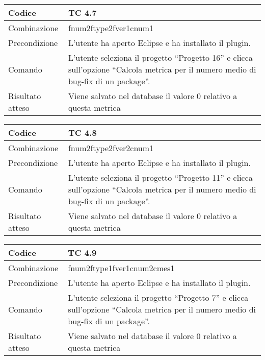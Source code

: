 \begin{table}[ht]
\begin{tabular}{|p{3cm}|p{9cm}|}
\hline
\cellcolor{lightgray}Codice				& TC 4.7								\\
\hline
\cellcolor{lightgray}Combinazione		& fnum2ftype2fver1cnum1							\\
\hline
\cellcolor{lightgray}Precondizione		& L'utente ha aperto Eclipse e ha installato il plugin.									\\
\hline
\cellcolor{lightgray}Comando			& L'utente seleziona il progetto ``Progetto 16''  e clicca sull'opzione ``Calcola metrica per il numero medio di bug-fix di un package''.	\\
\hline
\cellcolor{lightgray}Risultato atteso	& Viene salvato nel database il valore 0 relativo a questa metrica	\\
\hline
\end{tabular}
\end{table}

\begin{table}[ht]
\begin{tabular}{|p{3cm}|p{9cm}|}
\hline
\cellcolor{lightgray}Codice				& TC 4.8								\\
\hline
\cellcolor{lightgray}Combinazione		& fnum2ftype2fver2cnum1 									\\
\hline
\cellcolor{lightgray}Precondizione		& L'utente ha aperto Eclipse e ha installato il plugin.				\\
\hline
\cellcolor{lightgray}Comando			& L'utente seleziona il progetto ``Progetto 11''  e clicca sull'opzione ``Calcola metrica per il numero medio di bug-fix di un package''.	\\
\hline
\cellcolor{lightgray}Risultato atteso	& Viene salvato nel database il valore 0 relativo a questa metrica	\\
\hline
\end{tabular}
\end{table}

\begin{table}[ht]
\begin{tabular}{|p{3cm}|p{9cm}|}
\hline
\cellcolor{lightgray}Codice				& TC 4.9								\\
\hline
\cellcolor{lightgray}Combinazione		& fnum2ftype1fver1cnum2cmes1 									\\
\hline
\cellcolor{lightgray}Precondizione		& L'utente ha aperto Eclipse e ha installato il plugin.								\\
\hline
\cellcolor{lightgray}Comando			& L'utente seleziona il progetto ``Progetto 7''  e clicca sull'opzione ``Calcola metrica per il numero medio di bug-fix di un package''.	\\
\hline
\cellcolor{lightgray}Risultato atteso	& Viene salvato nel database il valore 0 relativo a questa metrica	\\
\hline
\end{tabular}
\end{table}

